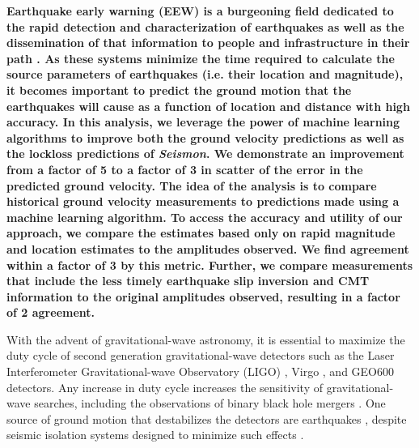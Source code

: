 \documentclass[preprint, aps, showpacs]{revtex4-1}
\begin{document}
\author{Hugh Radkins}

\author{Bas Swinkels}

\author{Keith Thorne}

\author{Jim Warner}

\maketitle

\textbf{Earthquake early warning (EEW) is a burgeoning field dedicated to the rapid detection and characterization of earthquakes as well as the dissemination of that information to people and infrastructure in their path \cite{Al2012,KuAl2013a,KuAl2013b,KuHe2014,CoLa2009a,CoLa2009b,BoAl2014,HoKa2008,HoEA2011c,StAl2016}.
As these systems minimize the time required to calculate the source parameters of earthquakes (i.e. their location and magnitude), it becomes important to predict the ground motion that the earthquakes will cause as a function of location and distance with high accuracy.
In this analysis, we leverage the power of machine learning algorithms to improve both the ground velocity predictions as well as the lockloss predictions of \emph{Seismon}. We demonstrate an improvement from a factor of 5 to a factor of 3 in scatter of the error in the predicted ground velocity.
The idea of the analysis is to compare historical ground velocity measurements 
to predictions made using a machine learning algorithm. 
To access the accuracy and utility of our approach, we compare the estimates based only on rapid magnitude and location estimates to the amplitudes observed.
We find agreement within a factor of 3 by this metric.
Further, we compare measurements that include the less timely earthquake slip inversion and CMT information to the original amplitudes observed, resulting in a factor of 2 agreement.}

With the advent of gravitational-wave astronomy, it is essential to maximize the duty cycle of second generation gravitational-wave detectors such as the Laser Interferometer Gravitational-wave Observatory (LIGO) \cite{aligo}, Virgo \cite{avirgo}, and GEO600 \cite{Gr2010} detectors.
Any increase in duty cycle increases the sensitivity of gravitational-wave searches, including the observations of binary black hole mergers \cite{AbEA2016a,AbEA2016e}.
One source of ground motion that destabilizes the detectors are earthquakes
\cite{CoSt2015,CoEa2017}, despite seismic isolation systems designed to minimize such effects \cite{AbAd2002,StAb2009,MaLa2015}.
\end{document}

